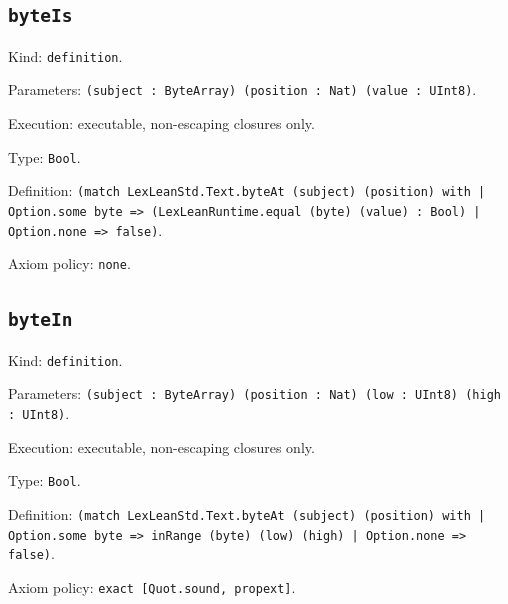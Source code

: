 \documentclass[11pt]{article}
\begin{document}
\subsection*{\texttt{byteIs}}
\noindent Kind: \texttt{definition}.\par
\noindent Parameters: \texttt{(subject : ByteArray) (position : Nat) (value : UInt8)}.\par
\noindent Execution: executable, non-escaping closures only.\par
\noindent Type: \texttt{Bool}.\par
\noindent Definition: \texttt{(match LexLeanStd.Text.byteAt (subject) (position) with | Option.some byte => (LexLeanRuntime.equal (byte) (value) : Bool) | Option.none => false)}.\par
\noindent Axiom policy: \texttt{none}.\par
\subsection*{\texttt{byteIn}}
\noindent Kind: \texttt{definition}.\par
\noindent Parameters: \texttt{(subject : ByteArray) (position : Nat) (low : UInt8) (high : UInt8)}.\par
\noindent Execution: executable, non-escaping closures only.\par
\noindent Type: \texttt{Bool}.\par
\noindent Definition: \texttt{(match LexLeanStd.Text.byteAt (subject) (position) with | Option.some byte => inRange (byte) (low) (high) | Option.none => false)}.\par
\noindent Axiom policy: \texttt{exact [Quot.sound, propext]}.\par
\end{document}
